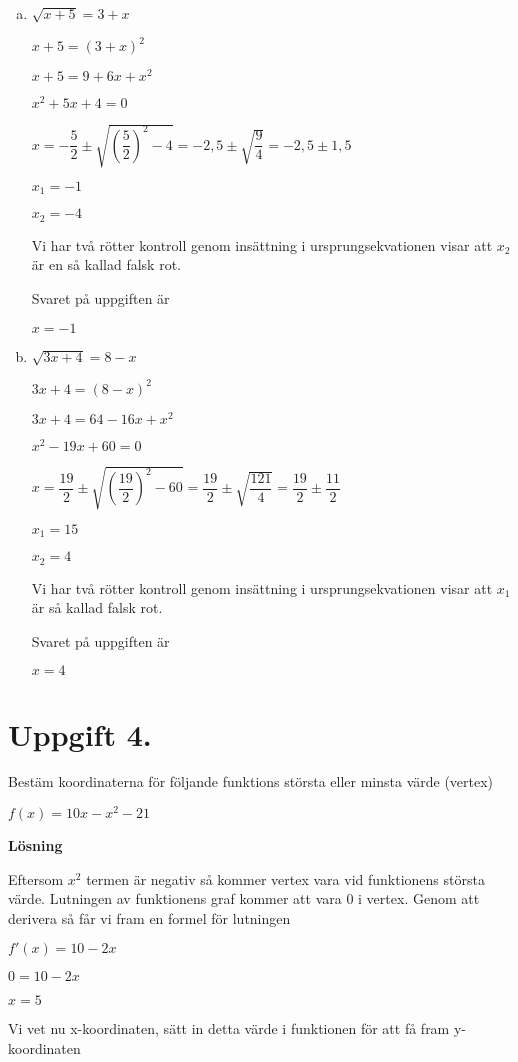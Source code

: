 \documentclass{article}
\begin{document}
\begin{enumerate}[(a)]
\item
$\sqrt{x+5}=3+x$

$x+5=(3+x)^2$

$x+5=9+6x+x^2$

$x^2+5x+4=0$

$x=-\dfrac{5}{2}\pm\sqrt{\left(\dfrac{5}{2}\right)^2-4}=-2,5\pm\sqrt{\dfrac{9}{4}}=-2,5\pm1,5$

$x_1 = -1$

$x_2 = -4$

Vi har två rötter kontroll genom insättning i ursprungsekvationen visar att $x_2$ är en så kallad falsk rot.

Svaret på uppgiften är 

$x = -1$

\item
$\sqrt{3x+4}=8-x$

$3x+4=(8-x)^2$

$3x+4=64-16x+x^2$

$x^2-19x+60=0$

$x=\dfrac{19}{2}\pm\sqrt{\left(\dfrac{19}{2}\right)^2-60}=\dfrac{19}{2}\pm\sqrt{\dfrac{121}{4}}=\dfrac{19}{2}\pm\dfrac{11}{2}$

$x_1 = 15$

$x_2 = 4$

Vi har två rötter kontroll genom insättning i ursprungsekvationen visar att $x_1$ är så kallad falsk rot.

Svaret på uppgiften är 

$x = 4$
\end{enumerate}

\section*{Uppgift 4.}
Bestäm koordinaterna för följande funktions största eller minsta värde (vertex)

$f(x)=10x-x^2-21$

\textbf{Lösning}

Eftersom $x^2$ termen är negativ så kommer vertex vara vid funktionens största värde. Lutningen av funktionens graf kommer att vara $0$ i vertex. Genom att derivera så får vi fram en formel för lutningen

$f'(x)=10-2x$

$0=10-2x$

$x=5$

Vi vet nu x-koordinaten, sätt in detta värde i funktionen för att få fram y-koordinaten
\end{document}
